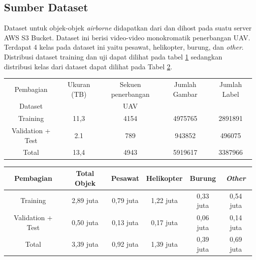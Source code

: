   \subsection{Sumber Dataset}
    Dataset untuk objek-objek \emph{airborne} didapatkan dari \textcite{aot_dataset} dan dihost pada suatu server AWS S3 Bucket.
    Dataset ini berisi video-video monokromatik penerbangan UAV.
    Terdapat 4 kelas pada dataset ini yaitu pesawat, helikopter, burung, dan \emph{other}.
    Distribusi dataset training dan uji dapat dilihat pada tabel \ref{tbl:datasettraintest} sedangkan distribusi kelas dari dataset dapat dilihat pada Tabel \ref{tbl:datasetclasses}.
    \begin{table}[h]
      \centering
      \label{tbl:datasettraintest}
      \begin{tabular}{|c|c|c|c|c|}
        \hline
        Pembagian & Ukuran (TB) & Sekuen penerbangan & Jumlah Gambar & Jumlah Label\\
        Dataset &  & UAV &  & \\
        \hline
        Training & 11,3 & 4154 & 4975765 & 2891891\\
        \hline
        Validation + Test &2.1 &789 & 943852 & 496075\\
        \hline
        Total &13,4 &4943 & 5919617 & 3387966\\
        \hline
      \end{tabular}
    \end{table}

    \begin{table}[h]
      \centering
      \label{tbl:datasetclasses}
      \begin{tabular}{|c|c|c|c|c|c|}
        \hline
        Pembagian & Total Objek & Pesawat & Helikopter & Burung & \emph{Other}\\
        \hline
        Training & 2,89 juta & 0,79 juta& 1,22 juta& 0,33 juta& 0,54 juta\\
        \hline
        Validation + Test &0,50 juta &0,13 juta & 0,17 juta&0,06 juta&0,14 juta\\
        \hline
        Total &3,39 juta &0,92 juta & 1,39 juta&0,39 juta&0,69 juta\\
        \hline
      \end{tabular}
    \end{table}
  
